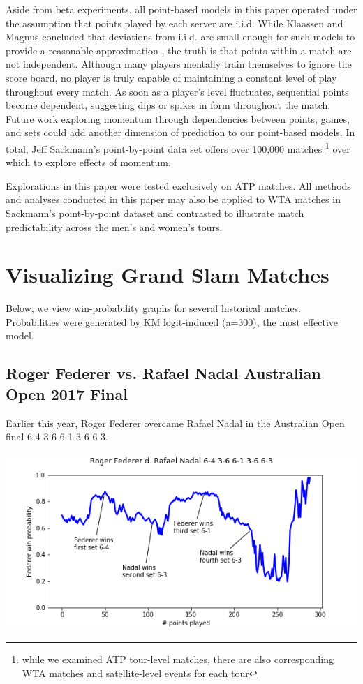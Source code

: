 \documentclass[chapterprefix=false]{report}
\begin{document}
Aside from beta experiments, all point-based models in this paper operated under the assumption that points played by each server are i.i.d. While Klaassen and Magnus concluded that deviations from i.i.d. are small enough for such models to provide a reasonable approximation \cite{KlaassenandMagnus2001}, the truth is that points within a match are not independent. Although many players mentally train themselves to ignore the score board, no player is truly capable of maintaining a constant level of play throughout every match. As soon as a player's level fluctuates, sequential points become dependent, suggesting dips or spikes in form throughout the match. Future work exploring momentum through dependencies between points, games, and sets could add another dimension of prediction to our point-based models. In total, Jeff Sackmann's point-by-point data set offers over 100,000 matches \footnote{while we examined ATP tour-level matches, there are also corresponding WTA matches and satellite-level events for each tour} over which to explore effects of momentum. 


Explorations in this paper were tested exclusively on ATP matches. All methods and analyses conducted in this paper may also be applied to WTA matches in Sackmann's point-by-point dataset and contrasted to illustrate match predictability across the men's and women's tours.

\section{Visualizing Grand Slam Matches}

Below, we view win-probability graphs for several historical matches. Probabilities were generated by KM logit-induced (a=300), the most effective model.

\subsection{Roger Federer vs. Rafael Nadal Australian Open 2017 Final}

Earlier this year, Roger Federer overcame Rafael Nadal in the Australian Open final 6-4 3-6 6-1 3-6 6-3.

\includegraphics[scale=.7]{federer_nadal_ao_17}
\end{document}
